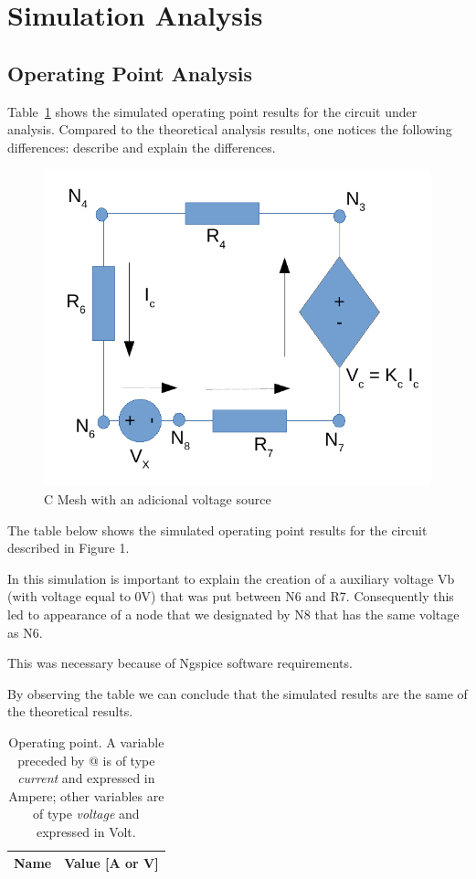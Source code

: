 \section{Simulation Analysis}
\label{sec:simulation}

\subsection{Operating Point Analysis}

Table~\ref{tab:op} shows the simulated operating point results for the circuit
under analysis. Compared to the theoretical analysis results, one notices the
following differences: describe and explain the differences.


\begin{figure}[h] \centering
\includegraphics[width=0.4\linewidth]{malhaC.pdf}
\caption{C Mesh with an adicional voltage source} %
\label{fig:malhaC}
\end{figure}

The table below shows the simulated operating point results for the circuit described in Figure 1.

In this simulation is important to explain the creation of a auxiliary voltage Vb (with voltage equal to 0V) that was put between N6 and R7. Consequently this led to appearance of a node that we designated by N8 that has the same voltage as N6.

This was necessary because of Ngspice software requirements.

By observing the table we can conclude that the simulated results are the same of the theoretical results.

\begin{table}[h]
  \centering
  \begin{tabular}{|l|r|}
    \hline    
    {\bf Name} & {\bf Value [A or V]} \\ \hline
    
  \end{tabular}
  \caption{Operating point. A variable preceded by @ is of type {\em current}
    and expressed in Ampere; other variables are of type {\it voltage} and expressed in
    Volt.}
  \label{tab:op}
\end{table}




